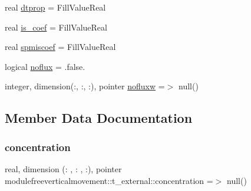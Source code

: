 \begin{DoxyCompactItemize}
real \mbox{\hyperlink{structmodulefreeverticalmovement_1_1t__external_a469878ffc8e8e99c0e0ecb9d05b4fcd9}{dtprop}} = Fill\+Value\+Real
\item 
real \mbox{\hyperlink{structmodulefreeverticalmovement_1_1t__external_a404a2c23d5febf318ea108f5fca6223d}{is\+\_\+coef}} = Fill\+Value\+Real
\item 
real \mbox{\hyperlink{structmodulefreeverticalmovement_1_1t__external_ac42c32b9bf9e024f1835fd9c37f5356f}{spmiscoef}} = Fill\+Value\+Real
\item 
logical \mbox{\hyperlink{structmodulefreeverticalmovement_1_1t__external_abeda5329783f42833c8f538807912382}{noflux}} = .false.
\item 
integer, dimension(\+:, \+:, \+:), pointer \mbox{\hyperlink{structmodulefreeverticalmovement_1_1t__external_af9d488d71cf716520a3bd18a760aa327}{nofluxw}} =$>$ null()
\end{DoxyCompactItemize}


\subsection{Member Data Documentation}
\mbox{\label{structmodulefreeverticalmovement_1_1t__external_a0745d990f09dfe49d4b4b83a37afe13c}} 
\subsubsection{\texorpdfstring{concentration}{concentration}}
{\footnotesize\ttfamily real, dimension   (\+: , \+: , \+:), pointer modulefreeverticalmovement\+::t\+\_\+external\+::concentration =$>$ null()\hspace{0.3cm}{\ttfamily [private]}}

\mbox{\label{structmodulefreeverticalmovement_1_1t__external_a616da3bd3674eb9a1719df902b4deefa}} 
